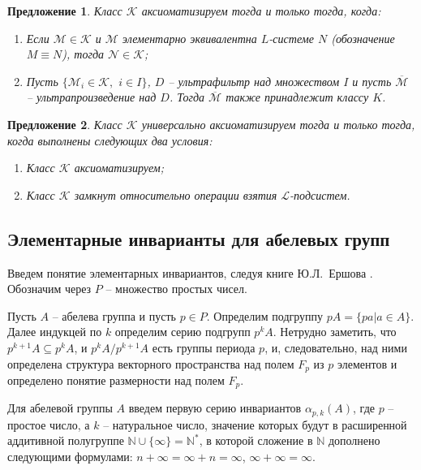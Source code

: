 \documentclass[a4paper,11pt,twoside]{article}
\newtheorem{proposition}{Предложение}[section]
\def\K{{\mathcal{K}}}
\def\L{{\mathcal{L}}}
\def\N{{\mathbb{N}}}
\begin{document}
\begin{proposition}\label{prop:AxiomClass}
Класс $\K$ аксиоматизируем тогда и только тогда, когда:
\begin{enumerate}
\item Если $\mathcal{M} \in \K$ и $\mathcal{M}$ элементарно эквивалентна $L$-системе $N$ (обозначение $M \equiv N$), тогда $\mathcal{N} \in \K$;
\item Пусть $\{\mathcal{M}_i \in \K,$ $i \in I\}$, $D$ -- ультрафильтр над множеством $I$ и пусть $\overline{\mathcal{M}}$ -- ультрапроизведение над $D$. Тогда $\overline{\mathcal{M}}$ также принадлежит классу $K$.
\end{enumerate}
\end{proposition}

\begin{proposition}\label{prop:AxiomClass2}
Класс $\K$ универсально аксиоматизируем тогда и только тогда, когда выполнены следующих два условия:
\begin{enumerate}
\item Класс $\K$ аксиоматизируем;
\item Класс $\K$ замкнут относительно операции взятия $\L$-подсистем.
\end{enumerate}
\end{proposition}



\subsection{Элементарные инварианты для абелевых групп}\label{sec:UnivInvariants}

Введем понятие элементарных инвариантов, следуя книге Ю.Л.~Ершова \cite{Ershov}. Обозначим через $P$ -- множество простых чисел.

Пусть $A$ -- абелева группа и пусть $p \in P$. Определим подгруппу $pA = \{ pa | a \in A\}$. Далее индукцей по $k$ определим серию подгрупп $p^k A$. Нетрудно заметить, что $p^{k+1} A \subseteq p^k A$, и $p^k A \Big/ p^{k+1} A$ есть группы периода $p$, и, следовательно, над ними определена структура векторного пространства над полем $F_p$ из $p$ элементов и определено понятие размерности над полем $F_p$.

Для абелевой группы $A$ введем первую серию инвариантов $\alpha_{p,k}(A)$, где $p$ -- простое число, а $k$ -- натуральное число, значение которых будут в расширенной аддитивной полугруппе $\N \cup \{\infty \} = \N^*$, в которой сложение в $\N$ дополнено следующими формулами: $n + \infty = \infty + n = \infty$, $\infty + \infty = \infty$.
\end{document}
